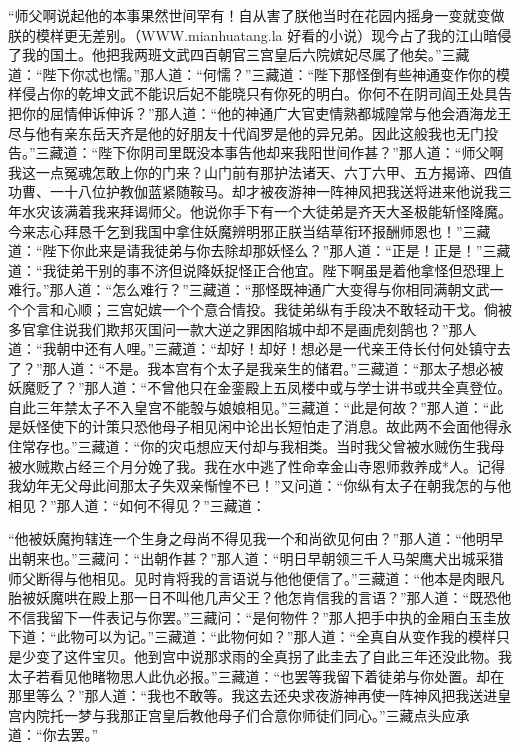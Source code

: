 \documentclass[12pt,UTF8]{ctexbook}
\begin{document}
“师父啊说起他的本事果然世间罕有！自从害了朕他当时在花园内摇身一变就变做朕的模样更无差别。（WWW.mianhuatang.la 好看的小说）现今占了我的江山暗侵了我的国土。他把我两班文武四百朝官三宫皇后六院嫔妃尽属了他矣。”三藏道：“陛下你忒也懦。”那人道：“何懦？”三藏道：“陛下那怪倒有些神通变作你的模样侵占你的乾坤文武不能识后妃不能晓只有你死的明白。你何不在阴司阎王处具告把你的屈情伸诉伸诉？”那人道：“他的神通广大官吏情熟都城隍常与他会酒海龙王尽与他有亲东岳天齐是他的好朋友十代阎罗是他的异兄弟。因此这般我也无门投告。”三藏道：“陛下你阴司里既没本事告他却来我阳世间作甚？”那人道：“师父啊我这一点冤魂怎敢上你的门来？山门前有那护法诸天、六丁六甲、五方揭谛、四值功曹、一十八位护教伽蓝紧随鞍马。却才被夜游神一阵神风把我送将进来他说我三年水灾该满着我来拜谒师父。他说你手下有一个大徒弟是齐天大圣极能斩怪降魔。今来志心拜恳千乞到我国中拿住妖魔辨明邪正朕当结草衔环报酬师恩也！”三藏道：“陛下你此来是请我徒弟与你去除却那妖怪么？”那人道：“正是！正是！”三藏道：“我徒弟干别的事不济但说降妖捉怪正合他宜。陛下啊虽是着他拿怪但恐理上难行。”那人道：“怎么难行？”三藏道：“那怪既神通广大变得与你相同满朝文武一个个言和心顺；三宫妃嫔一个个意合情投。我徒弟纵有手段决不敢轻动干戈。倘被多官拿住说我们欺邦灭国问一款大逆之罪困陷城中却不是画虎刻鹄也？”那人道：“我朝中还有人哩。”三藏道：“却好！却好！想必是一代亲王侍长付何处镇守去了？”那人道：“不是。我本宫有个太子是我亲生的储君。”三藏道：“那太子想必被妖魔贬了？”那人道：“不曾他只在金銮殿上五凤楼中或与学士讲书或共全真登位。自此三年禁太子不入皇宫不能彀与娘娘相见。”三藏道：“此是何故？”那人道：“此是妖怪使下的计策只恐他母子相见闲中论出长短怕走了消息。故此两不会面他得永住常存也。”三藏道：“你的灾屯想应天付却与我相类。当时我父曾被水贼伤生我母被水贼欺占经三个月分娩了我。我在水中逃了性命幸金山寺恩师救养成*人。记得我幼年无父母此间那太子失双亲惭惶不已！”又问道：“你纵有太子在朝我怎的与他相见？”那人道：“如何不得见？”三藏道：

“他被妖魔拘辖连一个生身之母尚不得见我一个和尚欲见何由？”那人道：“他明早出朝来也。”三藏问：“出朝作甚？”那人道：“明日早朝领三千人马架鹰犬出城采猎师父断得与他相见。见时肯将我的言语说与他他便信了。”三藏道：“他本是肉眼凡胎被妖魔哄在殿上那一日不叫他几声父王？他怎肯信我的言语？”那人道：“既恐他不信我留下一件表记与你罢。”三藏问：“是何物件？”那人把手中执的金厢白玉圭放下道：“此物可以为记。”三藏道：“此物何如？”那人道：“全真自从变作我的模样只是少变了这件宝贝。他到宫中说那求雨的全真拐了此圭去了自此三年还没此物。我太子若看见他睹物思人此仇必报。”三藏道：“也罢等我留下着徒弟与你处置。却在那里等么？”那人道：“我也不敢等。我这去还央求夜游神再使一阵神风把我送进皇宫内院托一梦与我那正宫皇后教他母子们合意你师徒们同心。”三藏点头应承道：“你去罢。”
\end{document}
